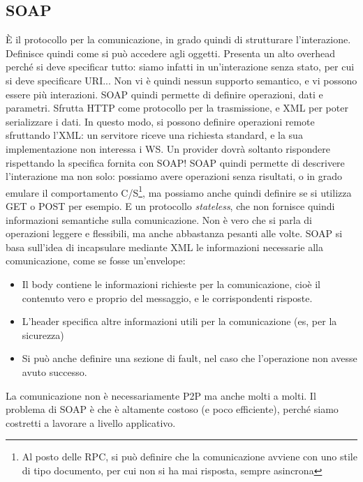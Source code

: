 \subsection{SOAP}
È il protocollo per la comunicazione, in grado quindi di strutturare l'interazione.
Definisce quindi come si può accedere agli oggetti. Presenta un alto overhead perché si deve specificar tutto: siamo
infatti in un'interazione senza stato, per cui si deve specificare URI... Non vi è quindi nessun supporto semantico,
e vi possono essere più interazioni.
SOAP quindi permette di definire operazioni, dati e parametri. Sfrutta HTTP come protocollo per la trasmissione, e XML
per poter serializzare i dati.
In questo modo, si possono definire operazioni remote sfruttando l'XML: un servitore riceve una richiesta standard, e 
la sua implementazione non interessa i WS. Un provider dovrà soltanto rispondere rispettando la specifica fornita con
SOAP! SOAP quindi permette di descrivere l'interazione ma non solo: possiamo avere operazioni senza risultati, o in
grado emulare il comportamento C/S\footnote{Al posto delle RPC, si può definire che la comunicazione avviene con uno
stile di tipo documento, per cui non si ha mai risposta, sempre asincrona}, ma possiamo anche quindi definire se si
utilizza GET o POST per esempio. E un protocollo \textit{stateless}, che non fornisce quindi informazioni semantiche
sulla comunicazione. Non è vero che si parla di operazioni leggere e flessibili, ma anche abbastanza pesanti alle volte.
SOAP si basa sull'idea di incapsulare mediante XML le informazioni necessarie alla comunicazione, come se fosse
un'envelope:
\begin{itemize}
 \item Il body contiene le informazioni richieste per la comunicazione, cioè il contenuto vero e proprio del 
 messaggio, e le corrispondenti risposte.
 \item L'header specifica altre informazioni utili per la comunicazione (es, per la sicurezza)
 \item Si può anche definire una sezione di fault, nel caso che l'operazione non avesse avuto successo.
\end{itemize}
La comunicazione non è necessariamente P2P ma anche molti a molti. Il problema di SOAP è che è altamente costoso (e 
poco efficiente), perché siamo costretti a lavorare a livello applicativo.
